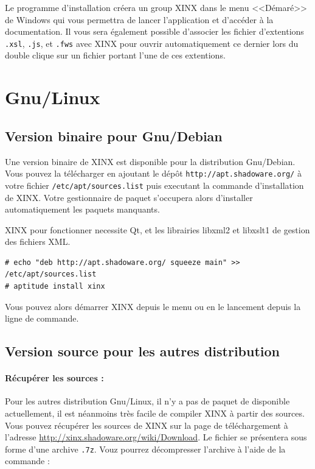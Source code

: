 \documentclass[a4paper,10pt,twoside]{book}
\begin{document}
Le programme d'installation créera un group XINX dans le menu <<Démaré>> de Windows qui vous permettra de lancer l'application et d'accéder à la documentation. Il vous sera également possible d'associer les fichier d'extentions \verb+.xsl+, \verb+.js+, et \verb+.fws+ avec XINX pour ouvrir automatiquement ce dernier lors du double clique sur un fichier portant l'une de ces extentions.

\section{Gnu/Linux}

\subsection{Version binaire pour Gnu/Debian}

Une version binaire de XINX est disponible pour la distribution Gnu/Debian. Vous pouvez la télécharger en ajoutant le dépôt \verb+http://apt.shadoware.org/+ à votre fichier \verb+/etc/apt/sources.list+ puis executant la commande d'installation de XINX. Votre gestionnaire de paquet s'occupera alors d'installer automatiquement les paquets manquants. 

XINX pour fonctionner necessite Qt, et les librairies libxml2 et libxslt1 de gestion des fichiers XML.

\begin{verbatim}
# echo "deb http://apt.shadoware.org/ squeeze main" >> /etc/apt/sources.list
# aptitude install xinx
\end{verbatim}

Vous pouvez alors démarrer XINX depuis le menu ou en le lancement depuis la ligne de commande. 

\subsection{Version source pour les autres distribution}

\paragraph{Récupérer les sources :}

Pour les autres distribution Gnu/Linux, il n'y a pas de paquet de disponible actuellement, il est néanmoins très facile de compiler XINX à partir des sources. Vous pouvez récupérer les sources de XINX sur la page de téléchargement à l'adresse \url{http://xinx.shadoware.org/wiki/Download}. Le fichier se présentera sous forme d'une archive \verb+.7z+. Vouz pourrez décompresser l'archive à l'aide de la commande :
\end{document}
